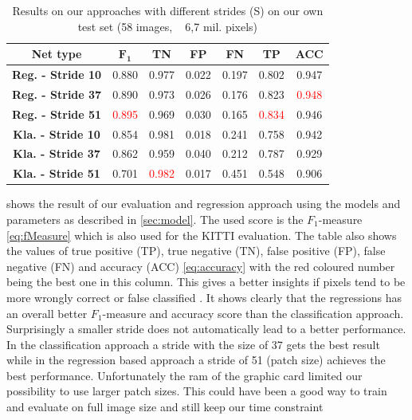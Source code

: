 \begin{table}[]
	\begin{center}
		\begin{tabular}{c|cccccc}
			\toprule
			\textbf{Net type} & {\bf $\mathbf{F_1}$} & \textbf{TN} & \textbf{FP} & \textbf{FN} & \textbf{TP} & \textbf{ACC} \\
			\midrule
			\textbf{Reg. - Stride 10} & 0.880 & 0.977 & 0.022 & 0.197 & 0.802 & 0.947\\
			\textbf{Reg. - Stride 37} & 0.890 & 0.973 & 0.026 & 0.176 & 0.823 &  \textcolor{red}{0.948}\\
			\textbf{Reg. - Stride 51} & \textcolor{red}{0.895} & 0.969 & 0.030 & 0.165 & \textcolor{red}{0.834} & 0.946\\
			\midrule
			\textbf{Kla. - Stride 10} & 0.854 & 0.981 & 0.018 & 0.241 & 0.758 & 0.942\\
			\textbf{Kla. - Stride 37} & 0.862 & 0.959 & 0.040 & 0.212 & 0.787 & 0.929\\
			\textbf{Kla. - Stride 51} & 0.701 & \textcolor{red}{0.982} & 0.017 & 0.451 & 0.548 & 0.906\\
			\bottomrule
		\end{tabular}
		\caption{Results on our approaches with different strides (S) on our own test set (58 images, ~ 6,7 mil. pixels)}
		\label{tab:ownapproach}
	\end{center}
\end{table}

 shows the result of our evaluation and regression
approach using the models and parameters as described in \cref{sec:model}. The
used score is the $F_1$-measure \cref{eq:fMeasure} which is also used for the
KITTI evaluation. The table also shows the values of true positive (TP), true
negative (TN), false positive (FP), false negative (FN) and accuracy (ACC)
\cref{eq:accuracy} with the red coloured number being the best one in this
column. This gives a better insights if pixels tend to be more wrongly correct
or false classified . It shows clearly that the regressions has an overall
better $F_1$-measure and accuracy score than the classification approach.
Surprisingly a smaller stride does not automatically lead to a better
performance. In the classification approach a stride with the size of 37 gets
the best result while in the regression based approach a stride of 51 (patch
size) achieves the best performance. Unfortunately the ram of the graphic card
limited our possibility to use larger patch sizes. This could have been a good
way to train and evaluate on full image size and still keep our time
constraint\\

